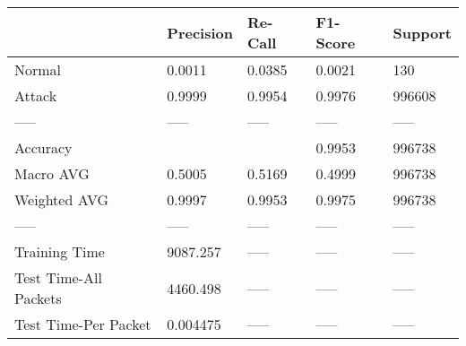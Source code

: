 \begin{tabular}{lllll}
\toprule
{} & Precision & Re-Call & F1-Score & Support \\
\midrule
Normal                &    0.0011 &  0.0385 &   0.0021 &     130 \\
Attack                &    0.9999 &  0.9954 &   0.9976 &  996608 \\
-----                 &     ----- &   ----- &    ----- &   ----- \\
Accuracy              &           &         &   0.9953 &  996738 \\
Macro AVG             &    0.5005 &  0.5169 &   0.4999 &  996738 \\
Weighted AVG          &    0.9997 &  0.9953 &   0.9975 &  996738 \\
-----                 &     ----- &   ----- &    ----- &   ----- \\
Training Time         &  9087.257 &   ----- &    ----- &   ----- \\
Test Time-All Packets &  4460.498 &   ----- &    ----- &   ----- \\
Test Time-Per Packet  &  0.004475 &   ----- &    ----- &   ----- \\
\bottomrule
\end{tabular}
